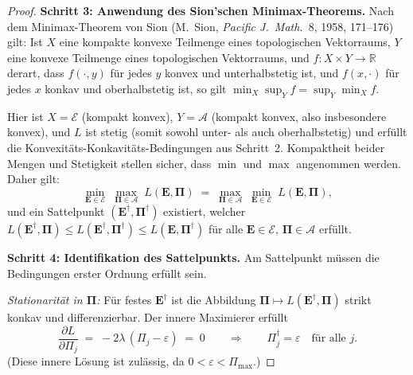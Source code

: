\documentclass[12pt,a4paper]{article}
\theoremstyle{definition}
\theoremstyle{plain}
\theoremstyle{remark}
\begin{document}
\begin{proof}
\smallskip\noindent
\textbf{Schritt 3: Anwendung des Sion'schen Minimax-Theorems.}\;
Nach dem Minimax-Theorem von Sion (M.~Sion, \emph{Pacific J.\ Math.}\ 8,
1958, 171--176) gilt: Ist $X$ eine kompakte konvexe Teilmenge eines topologischen
Vektorraums, $Y$ eine konvexe Teilmenge eines topologischen Vektorraums,
und $f: X \times Y \to \mathbb{R}$ derart, dass $f(\cdot, y)$ für
jedes $y$ konvex und unterhalbstetig ist, und $f(x, \cdot)$ für
jedes $x$ konkav und oberhalbstetig ist, so gilt
$\min_X \sup_Y f = \sup_Y \min_X f$.

Hier ist $X = \mathcal{E}$ (kompakt konvex), $Y = \mathcal{A}$ (kompakt
konvex, also insbesondere konvex), und $L$ ist stetig (somit
sowohl unter- als auch oberhalbstetig) und erfüllt die
Konvexitäts-Konkavitäts-Bedingungen aus Schritt~2. Kompaktheit beider
Mengen und Stetigkeit stellen sicher, dass $\min$ und $\max$ angenommen werden.
Daher gilt:
\begin{equation}\label{eq:sion-applied}
  \min_{\mathbf{E} \in \mathcal{E}}\;
  \max_{\boldsymbol{\Pi} \in \mathcal{A}}\;
  L(\mathbf{E}, \boldsymbol{\Pi})
  \;=\;
  \max_{\boldsymbol{\Pi} \in \mathcal{A}}\;
  \min_{\mathbf{E} \in \mathcal{E}}\;
  L(\mathbf{E}, \boldsymbol{\Pi}),
\end{equation}
und ein Sattelpunkt $(\mathbf{E}^\dagger, \boldsymbol{\Pi}^\dagger)$
existiert, welcher
$L(\mathbf{E}^\dagger, \boldsymbol{\Pi})
\le L(\mathbf{E}^\dagger, \boldsymbol{\Pi}^\dagger)
\le L(\mathbf{E}, \boldsymbol{\Pi}^\dagger)$
für alle $\mathbf{E} \in \mathcal{E}$,
$\boldsymbol{\Pi} \in \mathcal{A}$ erfüllt.

\smallskip\noindent
\textbf{Schritt 4: Identifikation des Sattelpunkts.}\;
Am Sattelpunkt müssen die Bedingungen erster Ordnung erfüllt sein.

\emph{Stationarität in $\boldsymbol{\Pi}$:}\;
Für festes $\mathbf{E}^\dagger$ ist die Abbildung
$\boldsymbol{\Pi} \mapsto L(\mathbf{E}^\dagger, \boldsymbol{\Pi})$
strikt konkav und differenzierbar. Der innere Maximierer
erfüllt
\[
  \frac{\partial L}{\partial \Pi_j}
  \;=\;
  -2\lambda\,(\Pi_j - \varepsilon)
  \;=\; 0
  \qquad\Longrightarrow\qquad
  \Pi_j^\dagger = \varepsilon \quad\text{für alle } j.
\]
(Diese innere Lösung ist zulässig, da
$0 < \varepsilon < \Pi_{\max}$.)


\end{proof}
\end{document}
